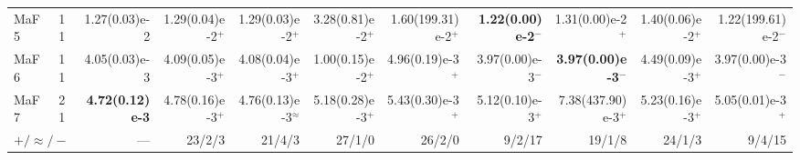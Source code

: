 \documentclass[pdflatex,sn-mathphys-ay]{sn-jnl}%
\theoremstyle{thmstyleone}%
\theoremstyle{thmstyletwo}%
\theoremstyle{thmstylethree}%
\begin{document}
\begin{landscape}
{\begin{longtable}{llrrrrrrrrr}
			MaF5                              & 11  & 1.27(0.03)e-2          & 1.29(0.04)e-2$^{+}$                & 1.29(0.03)e-2$^{+}$          & 3.28(0.81)e-2$^{+}$       & 1.60(199.31)e-2$^{+}$     & \textbf{1.22(0.00)e-2}$^{-}$ & 1.31(0.00)e-2$^{+}$          & 1.40(0.06)e-2$^{+}$          & 1.22(199.61)e-2$^{-}$       \\
			MaF6                              & 11  & 4.05(0.03)e-3          & 4.09(0.05)e-3$^{+}$                & 4.08(0.04)e-3$^{+}$          & 1.00(0.15)e-2$^{+}$       & 4.96(0.19)e-3$^{+}$       & 3.97(0.00)e-3$^{-}$          & \textbf{3.97(0.00)e-3}$^{-}$ & 4.49(0.09)e-3$^{+}$          & 3.97(0.00)e-3$^{-}$         \\
			MaF7                              & 21  & \textbf{4.72(0.12)e-3} & 4.78(0.16)e-3$^{+}$                & 4.76(0.13)e-3$^{\approx}$    & 5.18(0.28)e-3$^{+}$       & 5.43(0.30)e-3$^{+}$       & 5.12(0.10)e-3$^{+}$          & 7.38(437.90)e-3$^{+}$        & 5.23(0.16)e-3$^{+}$          & 5.05(0.01)e-3$^{+}$         \\
			\midrule
			\multicolumn{2}{l}{$+/\approx/-$} & --- & 23/2/3                 & 21/4/3                             & 27/1/0                       & 26/2/0                    & 9/2/17                    & 19/1/8                       & 24/1/3                       & 9/4/15                                                     \\
		\end{longtable}
	}
\end{landscape}
\end{document}

